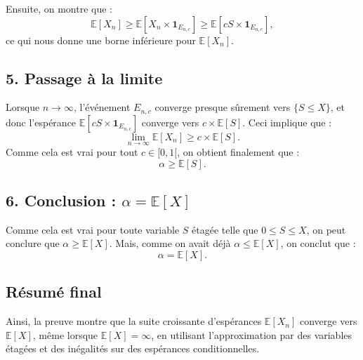 Ensuite, on montre que :
\[
\mathbb{E}[X_n] \geq \mathbb{E}[X_n \times \mathbf{1}_{E_{n,c}}] \geq \mathbb{E}[cS \times \mathbf{1}_{E_{n,c}}],
\]
ce qui nous donne une borne inférieure pour $\mathbb{E}[X_n]$.

\subsection*{5. Passage à la limite}

Lorsque $n \to \infty$, l'événement $E_{n,c}$ converge presque sûrement vers $\{S \leq X\}$, et donc l'espérance $\mathbb{E}[cS \times \mathbf{1}_{E_{n,c}}]$ converge vers $c \times \mathbb{E}[S]$. Ceci implique que :
\[
\lim_{n \to \infty} \mathbb{E}[X_n] \geq c \times \mathbb{E}[S].
\]
Comme cela est vrai pour tout $c \in [0,1[$, on obtient finalement que :
\[
\alpha \geq \mathbb{E}[S].
\]

\subsection*{6. Conclusion : $\alpha = \mathbb{E}[X]$}

Comme cela est vrai pour toute variable $S$ étagée telle que $0 \leq S \leq X$, on peut conclure que $\alpha \geq \mathbb{E}[X]$. Mais, comme on avait déjà $\alpha \leq \mathbb{E}[X]$, on conclut que :
\[
\alpha = \mathbb{E}[X].
\]

\subsection*{Résumé final}

Ainsi, la preuve montre que la suite croissante d'espérances $\mathbb{E}[X_n]$ converge vers $\mathbb{E}[X]$, même lorsque $\mathbb{E}[X] = \infty$, en utilisant l'approximation par des variables étagées et des inégalités sur des espérances conditionnelles.




